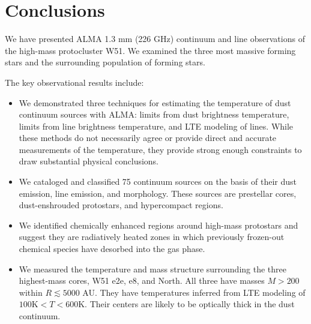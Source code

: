 \documentclass{emulateapj}
\begin{document}


\section{Conclusions}
\label{sec:conclusion}

We have presented ALMA 1.3 mm (226 GHz) continuum and line observations of the
high-mass protocluster W51.  We examined the three most massive forming stars
and the surrounding population of forming stars.  


The key observational results include:
\begin{itemize}
    \item We demonstrated three techniques for estimating the temperature of
        dust continuum sources with ALMA: limits from dust brightness
        temperature, limits from line brightness temperature, and LTE modeling
        of \methanol lines.  While these methods do not necessarily agree
        or provide direct and accurate measurements of the temperature, they
        provide strong enough constraints to draw substantial physical conclusions.
    \item We cataloged and classified 75 continuum sources on the basis of their
        dust emission, line emission, and morphology.  These sources are
        prestellar cores, dust-enshrouded protostars, and hypercompact \hii
        regions.
    \item We identified chemically enhanced regions around high-mass protostars
        and suggest they are radiatively heated zones in which previously
        frozen-out chemical species have desorbed into the gas phase.
    \item We measured the temperature and mass structure surrounding the three
        highest-mass cores, W51 e2e, e8, and North.  All three have masses
        $M>200$ \msun within $R\lesssim5000$ AU.  They have temperatures
        inferred from LTE modeling of \methanol $100 \mathrm{K} < T < 600
        \mathrm{K}$.  Their centers are likely to be optically thick in
        the dust continuum.
\end{itemize}
\end{document}
